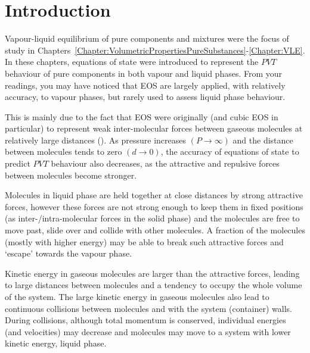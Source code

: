 \localtableofcontents
   


\section{Introduction}\label{Chapter:SolutionThermodynamics:Section:Introduction}
Vapour-liquid equilibrium of pure components and mixtures were the focus of study in Chapters~\ref{Chapter:VolumetricPropertiesPureSubstances}-\ref{Chapter:VLE}. In these chapters, equations of state were introduced to represent the $PVT$ behaviour of pure components in both vapour and liquid phases. From your readings, you may have noticed that EOS are largely applied, with relatively accuracy, to vapour phases, but rarely used to assess liquid phase behaviour. 

This is mainly due to the fact that EOS were originally (and cubic EOS in particular) to represent weak inter-molecular forces between gaseous molecules at relatively large distances (). As pressure increases $\left(P\rightarrow \infty\right)$ and the distance between molecules tends to zero $\left(d\rightarrow 0\right)$, the accuracy of equations of state to predict $PVT$ behaviour also decreases, as the attractive and repulsive forces between molecules become stronger. 

Molecules in liquid phase are held together at close distances by strong attractive forces, however these forces are not strong enough to keep them in fixed positions (as inter-/intra-molecular forces in the solid phase) and the molecules are free to move past, slide over and collide with other molecules. A fraction of the molecules (mostly with higher energy) may be able to break such attractive forces and `escape' towards the vapour phase. 

Kinetic energy in gaseous molecules are larger than the attractive forces, leading to large distances between molecules and a tendency to occupy the whole volume of the system. The large kinetic energy in gaseous molecules also lead to continuous collisions between molecules and with the system (container) walls. During collisions, although total momentum is conserved, individual energies (and velocities) may decrease and molecules may move to a system with lower kinetic energy, \ie liquid phase.

\bigskip

